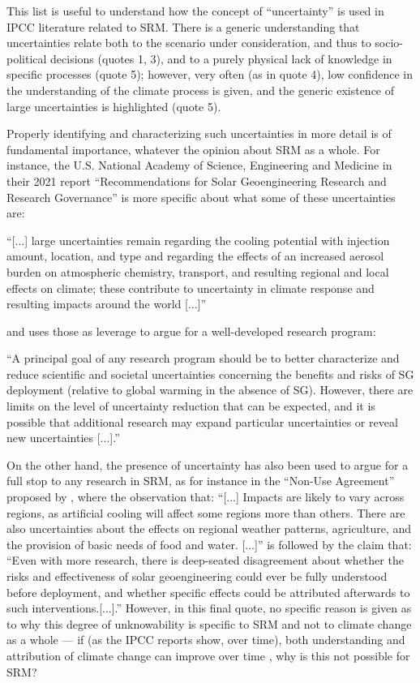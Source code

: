 \documentclass[draft]{agujournal2019}
\begin{document}
This list is useful to understand how the concept of ``uncertainty'' is used in IPCC literature related to SRM. There is a generic understanding that uncertainties relate both to the scenario under consideration, and thus to socio-political decisions (quotes 1, 3), and to a purely physical lack of knowledge in specific processes (quote 5); however, very often (as in quote 4), low confidence in the understanding of the climate process is given, and the generic existence of large uncertainties is highlighted (quote 5).

Properly identifying and characterizing such uncertainties in more detail is of fundamental importance, whatever the opinion about SRM as a whole. For instance, the U.S. National Academy of Science, Engineering and Medicine in their 2021 report ``Recommendations for Solar Geoengineering Research and Research Governance'' \cite{NASEM2021} is more specific about what some of these uncertainties are:

``[...] large uncertainties remain regarding the cooling potential with injection amount, location, and type and regarding the effects of an increased aerosol burden on atmospheric chemistry, transport, and resulting regional and local effects on climate; these contribute to uncertainty in climate response and resulting impacts around the world [...]''

and uses those as leverage to argue for a well-developed research program:

``A principal goal of any research program should be to better characterize and reduce scientific and societal uncertainties concerning the benefits and risks of SG deployment (relative to global warming in the absence of SG). However, there are limits on the level of uncertainty reduction that can be expected, and it is possible that additional research may expand particular uncertainties or reveal new uncertainties [...].''

On the other hand, the presence of uncertainty has also been used to argue for a full stop to any research in SRM, as for instance in the ``Non-Use Agreement'' proposed by , where the observation that: ``[...] Impacts are likely to vary across regions, as artificial cooling will affect some regions more than others. There are also uncertainties about the effects on regional weather patterns, agriculture, and the provision of basic needs of food and water. [...]'' is followed by the claim that: ``Even with more research, there is deep-seated disagreement about whether the risks and effectiveness of solar geoengineering could ever be fully understood before deployment, and whether specific effects could be attributed afterwards to such interventions.[...].'' However, in this final quote, no specific reason is given as to why this degree of unknowability is specific to SRM and not to climate change as a whole --- if (as the IPCC reports show, over time), both understanding and attribution of climate change can improve over time \cite{IPCC_2021_WGI}, why is this not possible for SRM?
\end{document}

